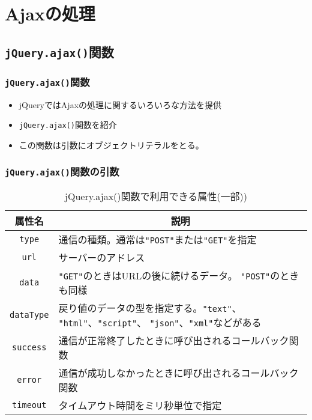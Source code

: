 \section{Ajaxの処理}
\subsection{\texttt{jQuery.ajax()}関数}
\begin{frame}[containsverbatim]
 \frametitle{\texttt{jQuery.ajax()}関数}
 \begin{itemize}
  \item jQueryではAjaxの処理に関するいろいろな方法を提供
  \item \texttt{jQuery.ajax()}関数を紹介
  \item この関数は引数にオブジェクトリテラルをとる。
 \end{itemize}
\end{frame}
\begin{frame}[containsverbatim]
 \frametitle{\texttt{jQuery.ajax()}関数の引数}
 \begin{table}[ht]
 \caption{jQuery.ajax()関数で利用できる属性(一部))}\label{jQueryAjax}
\begin{center}
 \begin{tabular}{|c|m{}|}\hline
属性名  &\multicolumn{1}{c|}{説明} \\\hline
  \texttt{type}&通信の種類。通常は\texttt{"POST"}または\texttt{"GET"}を指定\\
  \hline
  \texttt{url}&サーバーのアドレス\\ \hline
  \texttt{data}&\texttt{"GET"}のときはURLの後に続けるデータ。
      \texttt{"POST"}のときも同様
      \\ \hline
  \texttt{dataType}&戻り値のデータの型を指定する。\texttt{"text"}、
      \texttt{"html"}、\texttt{"script"}、      
\texttt{"json"}、\texttt{"xml"}などがある\\ \hline
\texttt{success}&通信が正常終了したときに呼び出されるコールバック関数
      \\ \hline
\texttt{error}&通信が成功しなかったときに呼び出されるコールバック関数
      \\ \hline
  \texttt{timeout}&タイムアウト時間をミリ秒単位で指定\\ \hline
 \end{tabular}
\end{center}
\end{table}
\end{frame}
